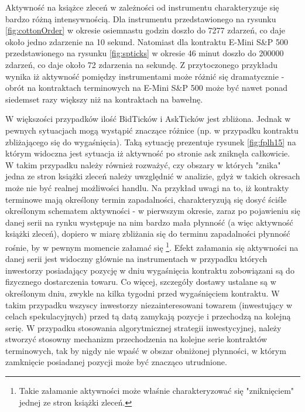 \documentclass[a4paper,12pt,openany, DIV=calc, headsepline]{scrbook}
\begin{document}
Aktywność na książce zleceń w zależności od instrumentu charakteryzuje się bardzo różną intensywnością. Dla instrumentu przedstawionego na rysunku \ref{fig:cottonOrder} w okresie osiemnastu godzin doszło do 7277 zdarzeń, co daje około jedno zdarzenie na 10 sekund. Natomiast dla kontraktu E-Mini S\&P 500 przedstawionego na rysunku \ref{fig:spticks} w okresie 46 minut doszło do 200000 zdarzeń, co daje około 72 zdarzenia na sekundę. Z przytoczonego przykładu wynika iż aktywność pomiędzy instrumentami może różnić się dramatycznie - obrót na kontraktach terminowych na E-Mini S\&P 500 może być nawet ponad siedemset razy większy niż na kontraktach na bawełnę.


W większości przypadków ilość BidTicków i AskTicków jest zbliżona. Jednak w pewnych sytuacjach mogą wystąpić znaczące różnice (np. w przypadku kontraktu zbliżającego się do wygaśnięcia). Taką sytuację prezentuje rysunek \ref{fig:fplh15} na którym widoczna jest sytuacja iż aktywność po stronie ask zniknęła całkowicie. W takim przypadku należy również rozważyć, czy obszary w których "znika" jedna ze stron książki zleceń należy uwzględnić w analizie, gdyż w takich okresach może nie być realnej możliwości handlu.  Na przykład uwagi na to, iż kontrakty terminowe mają określony termin zapadalności, charakteryzują się dosyć ściśle określonym schematem aktywności - w pierwszym okresie, zaraz po pojawieniu się danej serii na rynku występuje na nim bardzo mała płynność (a więc aktywność książki zleceń), dopiero w miarę zbliżania się do terminu zapadalności płynność rośnie, by w pewnym momencie załamać się \footnote{Takie załamanie aktywności może właśnie charakteryzować się "zniknięciem" jednej ze stron książki zleceń.}.
Efekt załamania się aktywności na danej serii jest widoczny głównie na instrumentach w przypadku których inwestorzy posiadający pozycję w dniu wygaśnięcia kontraktu zobowiązani są do fizycznego dostarczenia towaru. Co więcej, szczegóły dostawy ustalane są w określonym dniu, zwykle na kilka tygodni przed wygaśnięciem kontraktu. W takim przypadku wszyscy inwestorzy niezainteresowani towarem (inwestujący w celach spekulacyjnych) przed tą datą zamykają pozycje i przechodzą na kolejną serię. W przypadku stosowania algorytmicznej strategii inwestycyjnej, należy stworzyć stosowny mechanizm przechodzenia na kolejne serie kontraktów terminowych, tak by nigdy nie wpaść w obszar obniżonej płynności, w którym zamknięcie posiadanej pozycji może być znacząco utrudnione.
\end{document}
